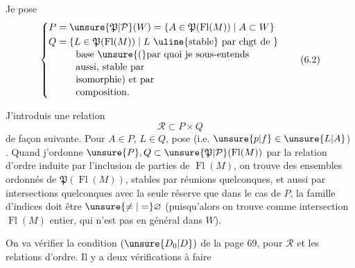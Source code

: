 Je pose 
\[
\left\{\begin{aligned}
P&=\unsure{\mathfrak{P}|\mathcal{P}}(W)=\{A\in\mathfrak{P}(\operatorname{Fl}(M))\mid A\subset W\}\\
Q&=\{L\in\mathfrak{P}(\operatorname{Fl}(M))\mid L\ \text{\uline{stable} par chgt de}\ \}\\[-2pt]
 &\qquad\text{base }\unsure{(}\text{par quoi je sous-entends}\\[-2pt]
 &\qquad\text{aussi, stable par}\\[-2pt]
 &\qquad\text{isomorphie) et par}\\[-2pt]
 &\qquad\text{composition}.
\end{aligned}\right.\tag*{(6.2)}
\]

J'introduis une relation
\[
\mathcal{R}\subset P\times Q
\]
de  façon suivante. Pour $A\in P$, $L\in Q$,
 pose
(i.e. 
  $\unsure{p|f}\in\unsure{L|A}$)
.
Quand j'ordonne  $\unsure{P}, Q\subset\unsure{\mathfrak{P}|\mathcal{P}}(\operatorname{Fl}(M))$
par la relation d'ordre induite par l'inclusion
de parties de $\operatorname{Fl}(M)$, on trouve des ensembles
ordonnés de $\mathfrak{P}(\operatorname{Fl}(M))$, stables par réunions
quelconques, et aussi par intersections quelconques
avec la seule réserve que dans le cas de
$P$, la famille  d'indices doit être $\unsure{\ne|=}\varnothing$
(puisqu'alors on trouve comme intersection
$\operatorname{Fl}(M)$  entier, qui n'est pas en général
 dans $W$).

On va vérifier la condition $(\unsure{D_0|D})$ de la
page 69, pour $\mathcal{R}$ et les relations d'ordre.
Il y a deux vérifications à faire


